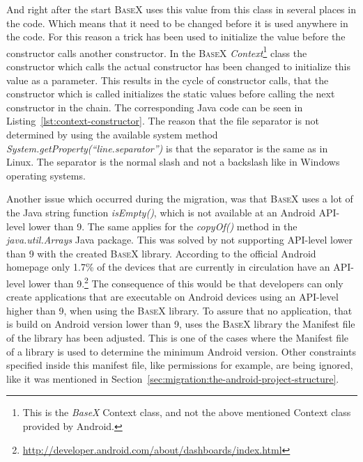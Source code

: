And right after the start \textsc{BaseX} uses this value from this class in several places in the code.
Which means that it need to be changed before it is used anywhere in the code.
For this reason a trick has been used to initialize the value before the constructor calls another constructor.
In the \textsc{BaseX} \textit{Context}\footnote{This is the \textit{BaseX} Context class, and not the above mentioned Context class provided by Android.} class the constructor which calls the actual constructor has been changed to initialize this value as a parameter.
This results in the cycle of constructor calls, that the constructor which is called initializes the static values before calling the next constructor in the chain.
The corresponding Java code can be seen in Listing~\ref{lst:context-constructor}.
The reason that the file separator is not determined by using the available system method \textit{System.getProperty(``line.separator'')} is that the separator is the same as in Linux.
The separator is the normal slash and not a backslash like in Windows operating systems.


Another issue which occurred during the migration, was that \textsc{BaseX} uses a lot of the Java string function \textit{isEmpty()}, which is not available at an Android API-level lower than 9.
The same applies for the \textit{copyOf()} method in the \textit{java.util.Arrays} Java package.
This was solved by not supporting API-level lower than 9 with the created \textsc{BaseX} library.
According to the official Android homepage only 1.7\% of the devices that are currently in circulation have an API-level lower than 9.\footnote{\url{http://developer.android.com/about/dashboards/index.html}}
The consequence of this would be that developers can only create applications that are executable on Android devices using an API-level higher than 9, when using the \textsc{BaseX} library.
To assure that no application, that is build on Android version lower than 9, uses the \textsc{BaseX} library the Manifest file of the library has been adjusted.
This is one of the cases where the Manifest file of a library is used to determine the minimum Android version.
Other constraints specified inside this manifest file, like permissions for example, are being ignored, like it was mentioned in Section~\ref{sec:migration:the-android-project-structure}.

